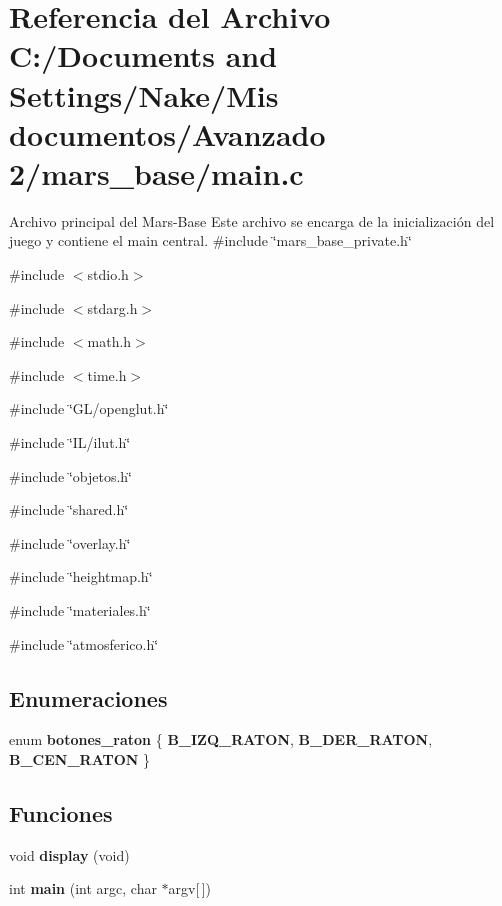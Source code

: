 \section{Referencia del Archivo C:/Documents and Settings/Nake/Mis documentos/Avanzado 2/mars\_\-base/main.c}
\label{main_8c}


Archivo principal del Mars-\/Base Este archivo se encarga de la inicialización del juego y contiene el main central.  
{\ttfamily \#include \char`\"{}mars\_\-base\_\-private.h\char`\"{}}\par
{\ttfamily \#include $<$stdio.h$>$}\par
{\ttfamily \#include $<$stdarg.h$>$}\par
{\ttfamily \#include $<$math.h$>$}\par
{\ttfamily \#include $<$time.h$>$}\par
{\ttfamily \#include \char`\"{}GL/openglut.h\char`\"{}}\par
{\ttfamily \#include \char`\"{}IL/ilut.h\char`\"{}}\par
{\ttfamily \#include \char`\"{}objetos.h\char`\"{}}\par
{\ttfamily \#include \char`\"{}shared.h\char`\"{}}\par
{\ttfamily \#include \char`\"{}overlay.h\char`\"{}}\par
{\ttfamily \#include \char`\"{}heightmap.h\char`\"{}}\par
{\ttfamily \#include \char`\"{}materiales.h\char`\"{}}\par
{\ttfamily \#include \char`\"{}atmosferico.h\char`\"{}}\par
\subsection*{Enumeraciones}
\begin{DoxyCompactItemize}
\item 
enum {\bfseries botones\_\-raton} \{ {\bfseries B\_\-IZQ\_\-RATON}, 
{\bfseries B\_\-DER\_\-RATON}, 
{\bfseries B\_\-CEN\_\-RATON}
 \}
\end{DoxyCompactItemize}
\subsection*{Funciones}
\begin{DoxyCompactItemize}
\item 
void {\bfseries display} (void)\label{main_8c_a4ea013001a5fb47853d0fab8f8de35cd}

\item 
int {\bfseries main} (int argc, char $\ast$argv[$\,$])\label{main_8c_a0ddf1224851353fc92bfbff6f499fa97}

\end{DoxyCompactItemize}
